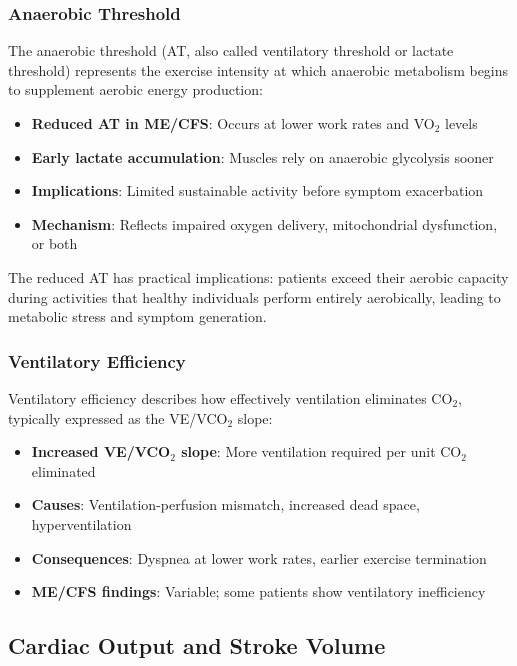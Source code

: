 \subsubsection{Anaerobic Threshold}
\label{sec:anaerobic-threshold}

The anaerobic threshold (AT, also called ventilatory threshold or lactate threshold) represents the exercise intensity at which anaerobic metabolism begins to supplement aerobic energy production:

\begin{itemize}
    \item \textbf{Reduced AT in ME/CFS}: Occurs at lower work rates and VO$_2$ levels
    \item \textbf{Early lactate accumulation}: Muscles rely on anaerobic glycolysis sooner
    \item \textbf{Implications}: Limited sustainable activity before symptom exacerbation
    \item \textbf{Mechanism}: Reflects impaired oxygen delivery, mitochondrial dysfunction, or both
\end{itemize}

The reduced AT has practical implications: patients exceed their aerobic capacity during activities that healthy individuals perform entirely aerobically, leading to metabolic stress and symptom generation.

\subsubsection{Ventilatory Efficiency}
\label{sec:ventilatory-efficiency}

Ventilatory efficiency describes how effectively ventilation eliminates CO$_2$, typically expressed as the VE/VCO$_2$ slope:

\begin{itemize}
    \item \textbf{Increased VE/VCO$_2$ slope}: More ventilation required per unit CO$_2$ eliminated
    \item \textbf{Causes}: Ventilation-perfusion mismatch, increased dead space, hyperventilation
    \item \textbf{Consequences}: Dyspnea at lower work rates, earlier exercise termination
    \item \textbf{ME/CFS findings}: Variable; some patients show ventilatory inefficiency
\end{itemize}

\subsection{Cardiac Output and Stroke Volume}
\label{sec:cardiac-output}

